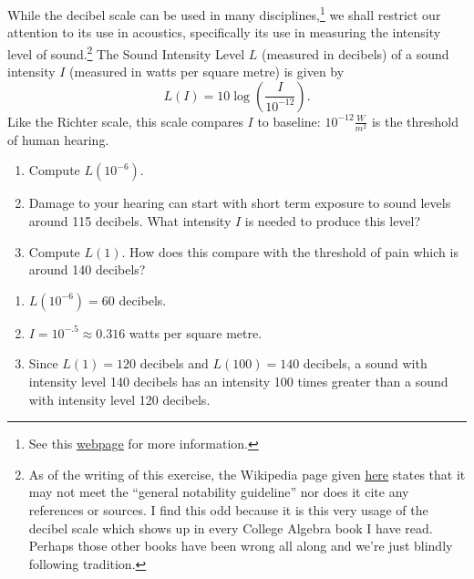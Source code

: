 {\label{decibelexercise}   While the decibel scale can be used in many disciplines,\footnote{See this  \href{http://en.wikipedia.org/wiki/Decibel}{\underline{webpage}} for more information.} we shall restrict our attention to its use in acoustics, specifically its use in measuring the intensity level of sound.\footnote{As of the writing of this exercise, the Wikipedia page given \href{http://en.wikipedia.org/wiki/Sound_intensity_level}{\underline{here}} states that it may not meet the ``general notability guideline'' nor does it cite any references or sources.  I find this odd because it is this very usage of the decibel scale which shows up in every College Algebra book I have read.  Perhaps those other books have been wrong all along and we're just blindly following tradition.}  The Sound Intensity Level $L$ (measured in decibels) of a sound intensity $I$ (measured in watts per square metre) is given by \[L(I) = 10\log\left( \dfrac{I}{10^{-12}} \right).\] Like the Richter scale, this scale compares $I$ to baseline: $10^{-12} \frac{W}{m^{2}}$ is the threshold of human hearing. 

\begin{enumerate}

\item Compute $L(10^{-6})$.
\item Damage to your hearing can start with short term exposure to sound levels around 115 decibels.  What intensity $I$ is needed to produce this level? 
\item Compute $L(1)$.  How does this compare with the threshold of pain which is around 140 decibels?

\end{enumerate}}
{ \begin{enumerate}

\item $L(10^{-6}) = 60$ decibels.
\item $I = 10^{-.5} \approx 0.316$ watts per square metre.
\item Since $L(1) = 120$ decibels and $L(100) = 140$ decibels, a sound with intensity level 140 decibels has an intensity 100 times greater than a sound with intensity level 120 decibels.

\end{enumerate}}